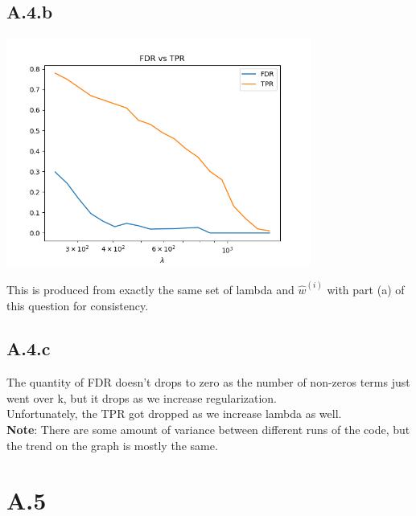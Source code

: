 \documentclass[]{article}
\begin{document}
    \subsection*{A.4.b}
        \begin{center}
            \includegraphics[width=10cm]{A4b-plot.png}
        \end{center}
        This is produced from exactly the same set of lambda and $\hat{w}^{(i)}$ with part (a) of this question for consistency. 
    \subsection*{A.4.c}
        The quantity of FDR doesn't drops to zero as the number of non-zeros terms just went over k, but it drops as we increase regularization. 
        \\
        Unfortunately, the TPR got dropped as we increase lambda as well. 
        \\
        \textbf{Note}: There are some amount of variance between different runs of the code, but the trend on the graph is mostly the same. 

\section*{A.5}
\end{document}
